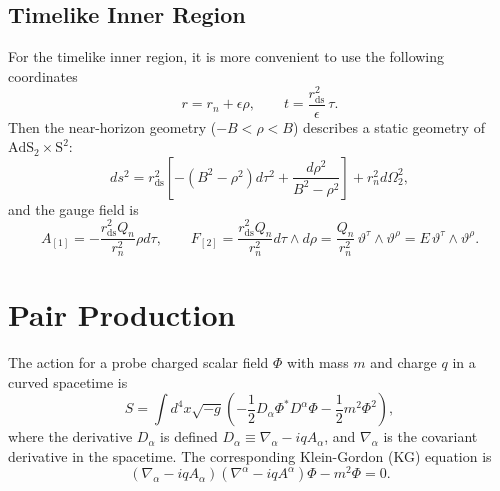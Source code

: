 \documentclass[aps,nofootinbib,superscriptaddress
]{revtex4}
\begin{document}
\subsection{Timelike Inner Region}
For the timelike inner region, it is more convenient to use the following coordinates
\begin{equation}
r = r_n + \epsilon \rho, \qquad t = \frac{r_\mathrm{ds}^2}{\epsilon} \, \tau.
\end{equation}
Then the near-horizon geometry ($-B < \rho < B$) describes a static geometry of $\mathrm{AdS}_2 \times \mathrm{S}^2$:
\begin{equation} \label{eq_inNariai}
ds^2 = r_\mathrm{ds}^2 \left[ -(B^2 - \rho^2) d\tau^2 + \frac{d\rho^2}{B^2 - \rho^2} \right] + r_n^2 d\Omega_2^2,
\end{equation}
and the gauge field is
\begin{equation}
A_{[1]} = - \frac{r_\mathrm{ds}^2 Q_n}{r_n^2} \rho d\tau, \qquad F_{[2]} = \frac{r_\mathrm{ds}^2 Q_n}{r_n^2} d\tau \wedge d\rho = \frac{Q_n}{r_n^2} \, \vartheta^\tau \wedge \vartheta^\rho = E \, \vartheta^\tau \wedge \vartheta^\rho.
\end{equation}


\section{Pair Production} \label{sec III}
The action for a probe charged scalar field $\Phi$ with mass $m$ and charge $q$ in a curved spacetime is
\begin{equation} \label{action}
S = \int d^4x \sqrt{-g} \left( - \frac12 D_\alpha \Phi^* D^\alpha \Phi - \frac12 m^2 \Phi^2 \right),
\end{equation}
where the derivative $D_\alpha$ is defined $D_{\alpha} \equiv \nabla_{\alpha} - i q A_{\alpha}$, and $\nabla_\alpha$ is the covariant derivative in the spacetime. The corresponding Klein-Gordon (KG) equation is
\begin{equation} \label{eom}
(\nabla_\alpha - i q A_\alpha) (\nabla^\alpha - i q A^\alpha) \Phi - m^2 \Phi = 0.
\end{equation}
\end{document}

